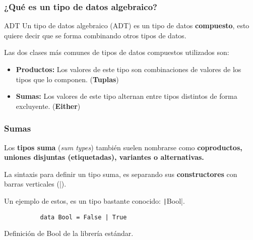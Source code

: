 \documentclass{beamer}
\begin{document}
\begin{frame}[fragile]
  \frametitle{¿Qué es un tipo de datos algebraico?}

  \begin{block}{ADT}
    \vspace{8pt}
    Un tipo de datos algebraico (ADT) es un tipo de datos \textbf{compuesto},
    esto quiere decir que se forma combinando otros tipos de datos.

    Las dos clases más comunes de tipos de datos compuestos utilizados son:
    \begin{itemize}
      \item \textbf{Productos:} Los valores de este tipo son combinaciones de valores de
        los tipos que lo componen. (\textbf{Tuplas})
      \item \textbf{Sumas:} Los valores de este tipo alternan entre tipos distintos de
        forma excluyente. (\textbf{Either})
    \end{itemize}
  \end{block}

\end{frame}

\begin{frame}[fragile]
  \frametitle{Sumas}

  Los \textbf{tipos suma} (\emph{sum types}) también suelen nombrarse como
  \textbf{coproductos, uniones disjuntas (etiquetadas), variantes o alternativas.}

  La sintaxis para definir un tipo suma, es separando sus \textbf{constructores} con
  barras verticales (|).

  Un ejemplo de estos, es un tipo bastante conocido: \texttt|Bool|.

  \begin{listing}[H]
    \begin{center}
      \begin{minipage}{0.5\textwidth}
        \begin{verbatim}
          data Bool = False | True
        \end{verbatim}
      \end{minipage}
    \end{center}
    \caption{Definición de Bool de la librería estándar.}
    \label{lst:booldefinition}
  \end{listing}

\end{frame}
\end{document}
